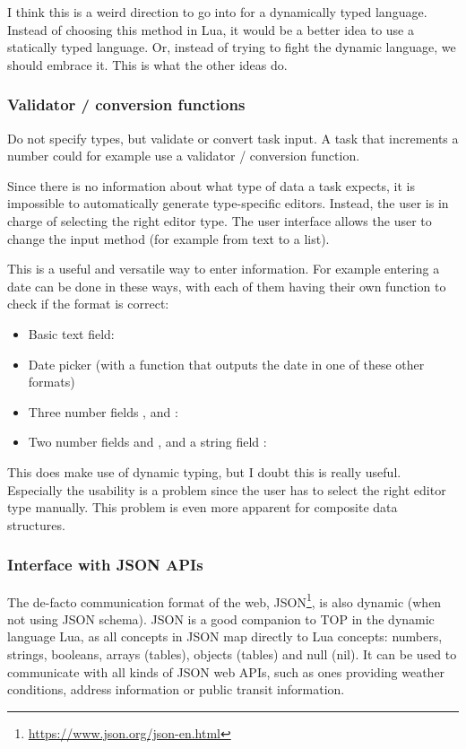 I think this is a weird direction to go into for a dynamically typed language. Instead of choosing this method in Lua, it would be a better idea to use a statically typed language. Or, instead of trying to fight the dynamic language, we should embrace it. This is what the other ideas do.

\subsubsection{Validator / conversion functions}
Do not specify types, but validate or convert task input. A task that increments a number could for example use a  validator / conversion function.

Since there is no information about what type of data a task expects, it is impossible to automatically generate type-specific editors. Instead, the user is in charge of selecting the right editor type. The user interface allows the user to change the input method (for example from text to a list).

This is a useful and versatile way to enter information. For example entering a date can be done in these ways, with each of them having their own function to check if the format is correct:
\begin{itemize}
    \item Basic text field: 
    \item Date picker (with a function that outputs the date in one of these other formats)
    \item Three number fields ,  and :\\
    \item Two number fields  and , and a string field :\\
\end{itemize}

This does make use of dynamic typing, but I doubt this is really useful. Especially the usability is a problem since the user has to select the right editor type manually. This problem is even more apparent for composite data structures.

\subsubsection{Interface with JSON APIs}
The de-facto communication format of the web, JSON\footnote{\url{https://www.json.org/json-en.html}}, is also dynamic (when not using JSON schema). JSON is a good companion to TOP in the dynamic language Lua, as all concepts in JSON map directly to Lua concepts: numbers, strings, booleans, arrays (tables), objects (tables) and null (nil). It can be used to communicate with all kinds of JSON web APIs, such as ones providing weather conditions, address information or public transit information.

